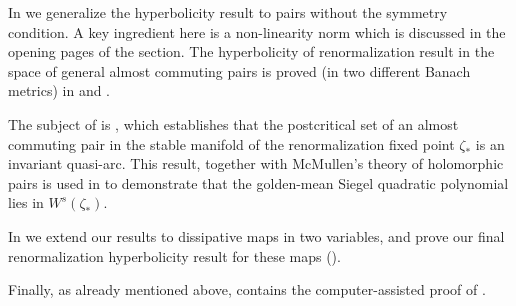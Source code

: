 In  we generalize the hyperbolicity result to pairs without the symmetry condition. A key ingredient here is a non-linearity norm which is discussed in the opening pages of the section. The hyperbolicity of renormalization result in the space of general almost commuting pairs is proved (in two different Banach metrics) in  and . 

The subject of  is , which establishes that the postcritical set of an almost commuting pair in the stable manifold of the renormalization fixed point $\zeta_*$ is an invariant quasi-arc. This result, together with McMullen's theory of holomorphic pairs is used in  to demonstrate that the golden-mean Siegel quadratic polynomial lies in $W^s(\zeta_*)$. 

In  we extend our results to dissipative maps in two variables, and prove our final renormalization hyperbolicity result for these maps ().

Finally, as already mentioned above,  contains the computer-assisted proof of .
